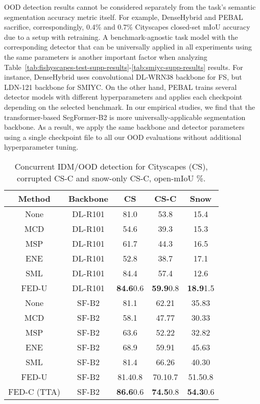 \documentclass[accepted, startpage]{uai2023}
\begin{document}
OOD detection results cannot be considered separately from the task's semantic segmentation accuracy metric itself. For example, DenseHybrid and PEBAL sacrifice, correspondingly, 0.4\% and 0.7\% Cityscapes closed-set mIoU accuracy due to a setup with retraining. A benchmark-agnostic task model with the corresponding detector that can be universally applied in all experiments using the same parameters is another important factor when analyzing Table~\ref{tab:fishyscapes-test-supp-results}-\ref{tab:smiyc-supp-results} results. For instance, DenseHybrid uses convolutional DL-WRN38 backbone for FS, but LDN-121 backbone for SMIYC. On the other hand, PEBAL trains several detector models with different hyperparameters and applies each checkpoint depending on the selected benchmark. In our empirical studies, we find that the transformer-based SegFormer-B2 is more universally-applicable segmentation backbone. As a result, we apply the same backbone and detector parameters using a single checkpoint file to all our OOD evaluations without additional hyperparameter tuning.

\begin{table}[t]
	\caption{Concurrent IDM/OOD detection for Cityscapes (CS), corrupted CS-C and snow-only CS-C, open-mIoU \%.}
	\label{tab:cityscapes-results}
	\centering
	\small
	\begin{tabular}{c|c|c|c|c}
		\toprule
		Method & Backbone & CS & CS-C & Snow \\
		\midrule
		None & DL-R101 & 81.0 & 53.8 & 15.4 \\
		MCD  & DL-R101 & 54.6 & 39.3 & 15.3 \\
		MSP  & DL-R101 & 61.7 & 44.3 & 16.5 \\
		ENE  & DL-R101 & 52.8 & 38.7 & 17.1 \\
		SML  & DL-R101 & 84.4 & 57.4 & 12.6 \\
		FED-U& DL-R101 & \textbf{84.6}\tiny0.6 & \textbf{59.9}\tiny0.8 & \textbf{18.9}\tiny1.5 \\
		\midrule
		None& SF-B2 & 81.1 & 62.21 & 35.83 \\
		MCD & SF-B2 & 58.1 & 47.77 & 30.33 \\
		MSP & SF-B2 & 63.6 & 52.22 & 32.82 \\
		ENE & SF-B2 & 68.9 & 59.91 & 45.63 \\
		SML & SF-B2 & 81.4 & 66.26 & 40.30 \\
		FED-U & SF-B2 & 81.4\tiny0.8 & 70.1\tiny0.7 & 51.5\tiny0.8 \\
		FED-C (TTA) & SF-B2 & \textbf{86.6}\tiny0.6 & \textbf{74.5}\tiny0.8 & \textbf{54.3}\tiny0.6 \\
		\bottomrule
	\end{tabular}
\end{table}
\end{document}
